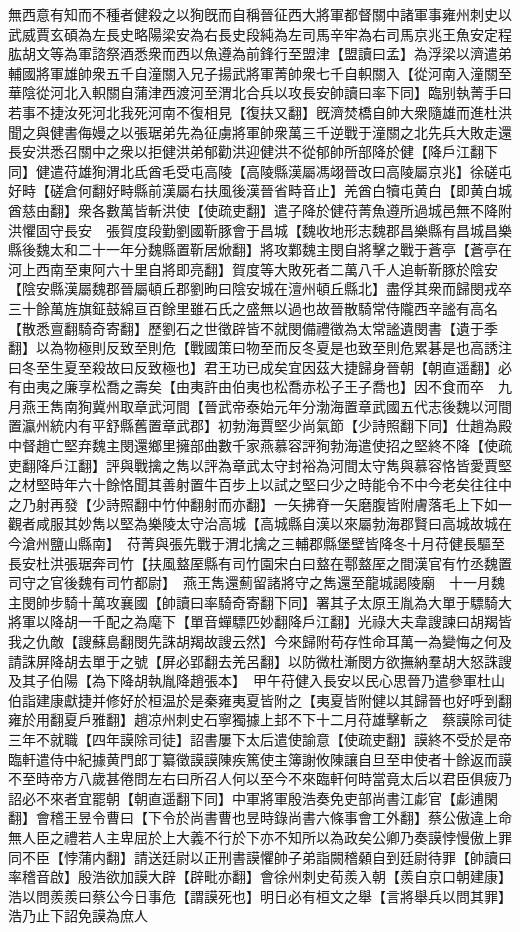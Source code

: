 無西意有知而不種者健殺之以狥旣而自稱晉征西大將軍都督關中諸軍事雍州刺史以武威賈玄碩為左長史略陽梁安為右長史段純為左司馬辛牢為右司馬京兆王魚安定程肱胡文等為軍諮祭酒悉衆而西以魚遵為前鋒行至盟津【盟讀曰孟】為浮梁以濟遣弟輔國將軍雄帥衆五千自潼關入兄子揚武將軍菁帥衆七千自軹關入【從河南入潼關至華陰從河北入軹關自蒲津西渡河至渭北合兵以攻長安帥讀曰率下同】臨别執菁手曰若事不捷汝死河北我死河南不復相見【復扶又翻】旣濟焚橋自帥大衆隨雄而進杜洪聞之與健書侮嫚之以張琚弟先為征虜將軍帥衆萬三千逆戰于潼關之北先兵大敗走還長安洪悉召關中之衆以拒健洪弟郁勸洪迎健洪不從郁帥所部降於健【降戶江翻下同】健遣苻雄狥渭北氐酋毛受屯高陵【高陵縣漢屬馮翊晉改曰高陵屬京兆】徐磋屯好畤【磋倉何翻好畤縣前漢屬右扶風後漢晉省畤音止】羌酋白犢屯黄白【即黄白城酋慈由翻】衆各數萬皆斬洪使【使疏吏翻】遣子降於健苻菁魚遵所過城邑無不降附洪懼固守長安　張賀度段勤劉國靳豚會于昌城【魏收地形志魏郡昌樂縣有昌城昌樂縣後魏太和二十一年分魏縣置靳居焮翻】將攻鄴魏主閔自將擊之戰于蒼亭【蒼亭在河上西南至東阿六十里自將即亮翻】賀度等大敗死者二萬八千人追斬靳豚於陰安【陰安縣漢屬魏郡晉屬頓丘郡劉昫曰陰安城在澶州頓丘縣北】盡俘其衆而歸閔戎卒三十餘萬旌旗鉦鼓綿亘百餘里雖石氏之盛無以過也故晉散騎常侍隴西辛謐有高名【散悉亶翻騎奇寄翻】歷劉石之世徵辟皆不就閔備禮徵為太常謐遺閔書【遺于季翻】以為物極則反致至則危【戰國策曰物至而反冬夏是也致至則危累碁是也高誘注曰冬至生夏至殺故曰反致極也】君王功已成矣宜因茲大捷歸身晉朝【朝直遥翻】必有由夷之廉享松喬之壽矣【由夷許由伯夷也松喬赤松子王子喬也】因不食而卒　九月燕王雋南狥冀州取章武河間【晉武帝泰始元年分渤海置章武國五代志後魏以河間置瀛州統内有平舒縣舊置章武郡】初勃海賈堅少尚氣節【少詩照翻下同】仕趙為殿中督趙亡堅弃魏主閔還鄉里擁部曲數千家燕慕容評狥勃海遣使招之堅終不降【使疏吏翻降戶江翻】評與戰擒之雋以評為章武太守封裕為河間太守雋與慕容恪皆愛賈堅之材堅時年六十餘恪聞其善射置牛百步上以試之堅曰少之時能令不中今老矣往往中之乃射再發【少詩照翻中竹仲翻射而亦翻】一矢拂脊一矢磨腹皆附膚落毛上下如一觀者咸服其妙雋以堅為樂陵太守治高城【高城縣自漢以來屬勃海郡賢曰高城故城在今滄州鹽山縣南】　苻菁與張先戰于渭北擒之三輔郡縣堡壁皆降冬十月苻健長驅至長安杜洪張琚奔司竹【扶風盩厔縣有司竹園宋白曰盩在鄠盩厔之間漢官有竹丞魏置司守之官後魏有司竹都尉】　燕王雋還薊留諸將守之雋還至龍城謁陵廟　十一月魏主閔帥步騎十萬攻襄國【帥讀曰率騎奇寄翻下同】署其子太原王胤為大單于驃騎大將軍以降胡一千配之為麾下【單音蟬驃匹妙翻降戶江翻】光祿大夫韋謏諫曰胡羯皆我之仇敵【謏蘇島翻閔先誅胡羯故謏云然】今來歸附苟存性命耳萬一為變悔之何及請誅屏降胡去單于之號【屏必郢翻去羌呂翻】以防微杜漸閔方欲撫納羣胡大怒誅謏及其子伯陽【為下降胡執胤降趙張本】　甲午苻健入長安以民心思晉乃遣參軍杜山伯詣建康獻捷并修好於桓温於是秦雍夷夏皆附之【夷夏皆附健以其歸晉也好呼到翻雍於用翻夏戶雅翻】趙凉州刺史石寧獨據上邽不下十二月苻雄擊斬之　蔡謨除司徒三年不就職【四年謨除司徒】詔書屢下太后遣使諭意【使疏吏翻】謨終不受於是帝臨軒遣侍中紀據黄門郎丁纂徵謨謨陳疾篤使主簿謝攸陳讓自旦至申使者十餘返而謨不至時帝方八歲甚倦問左右曰所召人何以至今不來臨軒何時當竟太后以君臣俱疲乃詔必不來者宜罷朝【朝直遥翻下同】中軍將軍殷浩奏免吏部尚書江虨官【虨逋閑翻】會稽王昱令曹曰【下令於尚書曹也昱時錄尚書六條事會工外翻】蔡公傲違上命無人臣之禮若人主卑屈於上大義不行於下亦不知所以為政矣公卿乃奏謨悖慢傲上罪同不臣【悖蒲内翻】請送廷尉以正刑書謨懼帥子弟詣闕稽顙自到廷尉待罪【帥讀曰率稽音啟】殷浩欲加謨大辟【辟毗亦翻】會徐州刺史荀羨入朝【羨自京口朝建康】浩以問羨羨曰蔡公今日事危【謂謨死也】明日必有桓文之舉【言將舉兵以問其罪】浩乃止下詔免謨為庶人

